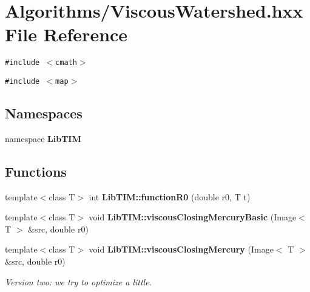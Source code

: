 \section{Algorithms/Viscous\-Watershed.hxx File Reference}
\label{ViscousWatershed_8hxx}
{\tt \#include $<$cmath$>$}\par
{\tt \#include $<$map$>$}\par
\subsection*{Namespaces}
\begin{CompactItemize}
\item 
namespace {\bf Lib\-TIM}
\end{CompactItemize}
\subsection*{Functions}
\begin{CompactItemize}
\item 
template$<$class T$>$ int {\bf Lib\-TIM::function\-R0} (double r0, T t)
\item 
template$<$class T$>$ void {\bf Lib\-TIM::viscous\-Closing\-Mercury\-Basic} (Image$<$ T $>$ \&src, double r0)
\item 
template$<$class T$>$ void {\bf Lib\-TIM::viscous\-Closing\-Mercury} (Image$<$ T $>$ \&src, double r0)
\begin{CompactList}\small\item\em Version two: we try to optimize a little. \item\end{CompactList}\end{CompactItemize}
